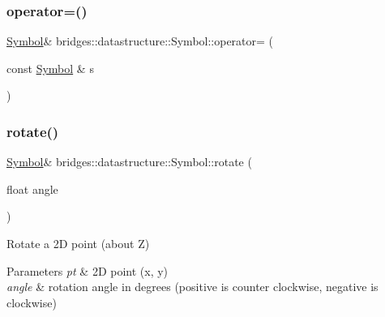 \subsubsection{\texorpdfstring{operator=()}{operator=()}}
{\footnotesize\ttfamily \hyperlink{classbridges_1_1datastructure_1_1_symbol}{Symbol}\& bridges\+::datastructure\+::\+Symbol\+::operator= (\begin{DoxyParamCaption}\item[{const \hyperlink{classbridges_1_1datastructure_1_1_symbol}{Symbol} \&}]{s }\end{DoxyParamCaption})\hspace{0.3cm}{\ttfamily [inline]}}

\mbox{\label{classbridges_1_1datastructure_1_1_symbol_a85f585750a1948576548349619233bb3}} 
\subsubsection{\texorpdfstring{rotate()}{rotate()}\hspace{0.1cm}{\footnotesize\ttfamily [1/2]}}
{\footnotesize\ttfamily \hyperlink{classbridges_1_1datastructure_1_1_symbol}{Symbol}\& bridges\+::datastructure\+::\+Symbol\+::rotate (\begin{DoxyParamCaption}\item[{float}]{angle }\end{DoxyParamCaption})\hspace{0.3cm}{\ttfamily [inline]}}



Rotate a 2D point (about Z) 


\begin{DoxyParams}{Parameters}
{\em pt} & 2D point (x, y) \\
\hline
{\em angle} & rotation angle in degrees (positive is counter clockwise, negative is clockwise) \\
\hline
\end{DoxyParams}
\mbox{\label{classbridges_1_1datastructure_1_1_symbol_a6464d5a9ce0405097871ef7e6e015e7b}} 
